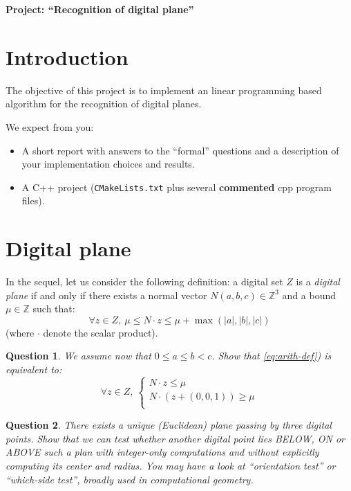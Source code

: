 \documentclass[a4paper, 11pt]{article}
\title{}
\author{}
\date{}
\newtheorem{qu}{Question}
\begin{document}
\begin{center}
	\LARGE \textbf{Project: ``Recognition of digital plane''}
\end{center}

\section*{Introduction}

The objective of this project is to implement an linear programming based algorithm
for the recognition of digital planes. 

We expect from you:
\begin{itemize}
\item A short report with answers to the ``formal'' questions and a
  description of your implementation choices and results.
\item A C++ project (\texttt{CMakeLists.txt} plus several
  \textbf{commented} cpp program files).
\end{itemize}


\section{Digital plane}

In the sequel, let us consider the following definition: 
a digital set $Z$ is a \emph{digital plane} if and only if 
there exists a normal vector $N(a,b,c) \in \mathbb{Z}^3$ and 
a bound $\mu \in \mathbb{Z}$ such that:
\begin{equation}
\label{eq:arith-def}
    \forall z \in Z, \: \mu \leq N \cdot z \leq \mu + \max{(|a|,|b|,|c|)}
\end{equation}
(where $\cdot$ denote the scalar product). 

\begin{qu}
We assume now that $0 \leq a \leq b < c$. 
Show that \ref{eq:arith-def}) is equivalent to: 
\begin{equation}
\forall z \in Z, \:
  \left\{
  \begin{array}{l}
     N \cdot z \leq \mu  \\
     N \cdot (z+(0,0,1)) \geq \mu  \\
  \end{array}
  \right.
\end{equation}
\end{qu}


\begin{qu}
There exists a unique (Euclidean) plane passing by three digital points. Show that we can test whether another digital
point lies BELOW, ON or ABOVE such a plan with integer-only computations and without explicitly computing 
its center and radius. You may have a look at ``orientation test'' or ``which-side test'', broadly used in computational geometry. 
\end{qu}
\end{document}
